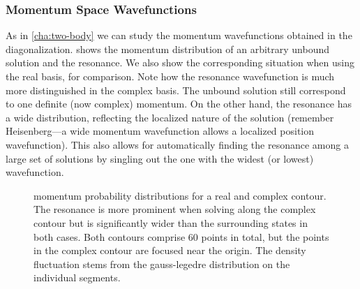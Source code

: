 \documentclass[../main/report.tex]{subfiles}
\begin{document}


\subsubsection{Momentum Space Wavefunctions}

As in \cref{cha:two-body} we can study the momentum wavefunctions obtained in the diagonalization.
 shows the momentum distribution of an arbitrary unbound solution and the resonance. We also show the corresponding situation when using the real basis, for comparison. Note how the resonance wavefunction is much more distinguished in the complex basis.  
The unbound solution still correspond to one definite (now complex) momentum. 
On the other hand, the resonance has a wide distribution, reflecting the localized nature of the solution 
(remember Heisenberg---a wide momentum wavefunction allows a localized position wavefunction). 
This also allows for automatically finding the resonance among a large set of solutions by singling out the one with the widest (or lowest) wavefunction.


\begin{figure}
\caption{ momentum probability distributions for a real and complex contour. The resonance is more prominent when solving along the complex contour but is significantly wider than the surrounding states in both cases. Both contours comprise 60 points in total, but the points in the complex contour are focused near the origin. The density fluctuation stems from the gauss-legedre distribution on the individual segments.} 
\label{fig:complex_mom_wavefunctions}
\end{figure}


\end{document}
